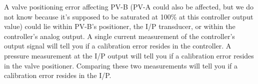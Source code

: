 \vskip 10pt

A valve positioning error affecting PV-B (PV-A could also be affected, but we do not know because it's supposed to be saturated at 100\% at this controller output value) could lie within PV-B's positioner, the I/P transducer, or within the controller's analog output.  A single current measurement of the controller's output signal will tell you if a calibration error resides in the controller.  A pressure measurement at the I/P output will tell you if a calibration error resides in the valve positioner.  Comparing these two measurements will tell you if a calibration error resides in the I/P.



